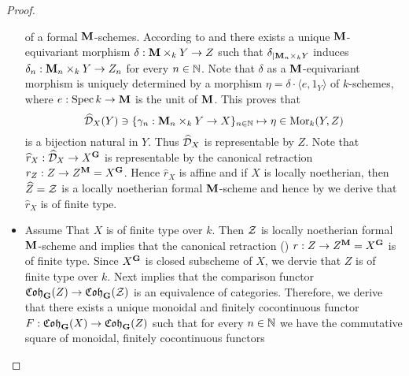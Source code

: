 \begin{proof}
\begin{itemize}
\begin{center}
\end{center}
of a formal $\mathbf{M}$-schemes. According to {\cite[Example 7.3]{Algebraization}} and {\cite[Corollary 7.4]{Algebraization}} there exists a unique $\mathbf{M}$-equivariant morphism $\delta:\mathbf{M}\times_kY\rightarrow Z$ such that $\delta_{\mid \mathbf{M}_n\times_kY}$ induces $\delta_n:\mathbf{M}_n\times_kY\rightarrow Z_n$ for every $n\in {\mathbb N}$. Note that $\delta$ as a $\mathbf{M}$-equivariant morphism is uniquely determined by a morphism $\eta = \delta \cdot \langle e,1_Y \rangle$ of $k$-schemes, where $e:\mathrm{Spec}\, k\rightarrow \mathbf{M}$ is the unit of $\mathbf{M}$. This proves that
$$\widehat{{\mathcal D}}_X(Y) \ni \{\gamma_n:\mathbf{M}_n\times_kY\rightarrow X\}_{n\in {\mathbb N}} \mapsto \eta \in \mathrm{Mor}_k(Y,Z)$$
is a bijection natural in $Y$. Thus $\widehat{{\mathcal D}}_X$ is representable by $Z$. Note that $\widehat{r}_X:\widehat{{\mathcal D}}_X\rightarrow X^{\mathbf{G}}$ is representable by the canonical retraction $r_Z:Z\rightarrow Z^{\mathbf{M}} = X^{\mathbf{G}}$. Hence $\widehat{r}_X$ is affine and if $X$ is locally noetherian, then $\widehat{Z} = {\mathcal Z}$ is a locally noetherian formal $\mathbf{M}$-scheme and hence by {\cite[Theorem 7.5]{Algebraization}} we derive that $\widehat{r}_X$ is of finite type.
\item Assume That $X$ is of finite type over $k$. Then ${\mathcal Z}$ is locally noetherian formal $\mathbf{M}$-scheme and {\cite[Theorem 7.5]{Algebraization}} implies that the canonical retraction ({\cite[Proposition 5.2]{Algebraization}}) $r:Z\rightarrow Z^{\mathbf{M}} = X^{\mathbf{G}}$ is of finite type. Since $X^{\mathbf{G}}$ is closed subscheme of $X$, we dervie that $Z$ is of finite type over $k$. Next {\cite[Theorem 7.6]{Algebraization}} implies that the comparison functor $\mathfrak{Coh}_{\mathbf{G}}(Z)\rightarrow \mathfrak{Coh}_{\mathbf{G}}({\mathcal Z})$ is an equivalence of categories. Therefore, we derive that there exists a unique monoidal and finitely cocontinuous functor $F:\mathfrak{Coh}_{\mathbf{G}}(X)\rightarrow \mathfrak{Coh}_{\mathbf{G}}(Z)$ such that for every $n\in {\mathbb N}$ we have the commutative square of monoidal, finitely cocontinuous functors
\begin{center}

\end{center}
\end{itemize}
\end{proof}
